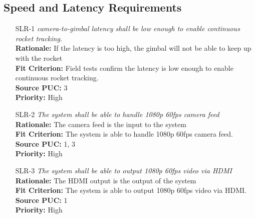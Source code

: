 \documentclass[12pt]{article}
\begin{document}
\subsection{Speed and Latency Requirements}
\begin{itemize}[leftmargin=*]
  \item[SLR-1] \emph{camera-to-gimbal latency shall be low enough to enable continuous
          rocket tracking.}\\[2mm]
        \textbf{Rationale:} If the latency is too high, the gimbal will not be able to keep up with the rocket\\
        \textbf{Fit Criterion:} Field tests confirm the latency is low enough to enable continuous rocket tracking.\\
        \textbf{Source PUC:} 3 \\
        \textbf{Priority:} High

  \item[SLR-2] \emph{The system shall be able to handle 1080p 60fps camera feed}\\[2mm]
        \textbf{Rationale:} The camera feed is the input to the system\\
        \textbf{Fit Criterion:} The system is able to handle 1080p 60fps camera feed.\\
        \textbf{Source PUC:} 1, 3 \\
        \textbf{Priority:} High

  \item[SLR-3] \emph{The system shall be able to output 1080p 60fps video via HDMI}\\[2mm]
        \textbf{Rationale:} The HDMI output is the output of the system\\
        \textbf{Fit Criterion:} The system is able to output 1080p 60fps video via HDMI.\\
        \textbf{Source PUC:} 1 \\
        \textbf{Priority:} High
\end{itemize}
\end{document}
